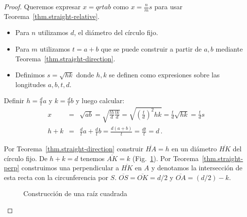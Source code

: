 \begin{proof}
Queremos expresar $x=qrt{ab}$ como $x=\displaystyle\frac{n}{m}s$ para usar Teorema~\ref{thm.straight-relative}.
\begin{itemize}
\setlength{\itemsep}{0pt}
\item Para $n$ utilizamos $d$, el diámetro del círculo fijo.
\item Para $m$ utilizamos $t=a+b$ que se puede construir a partir de $a,b$ mediante Teorema~\ref{thm.straight-direction}.
\item Definimos $s=\sqrt{hk}$ donde $h,k$ se definen como expresiones sobre las longitudes $a,b,t,d$.
\end{itemize}
Definir $h=\displaystyle\frac{d}{t}a$ y $k=\displaystyle\frac{d}{t}b$ y luego calcular:
\begin{eqnarray*}
x&=&\sqrt{ab}=\sqrt{\frac{th}{d}\frac{tk}{d}}=\sqrt{\left(\frac{t}{d}\right)^2hk}=\frac{t}{d}\sqrt{hk}=\frac{t}{d}s\\
h+k &=& \frac{d}{t}a + \frac{d}{t}b = \frac{d(a+b)}{t} = \frac{dt}{t} = d\,.
\end{eqnarray*}

Por Teorema~\ref{thm.straight-direction} construir $\overline{HA}= h$ en un diámetro $\overline{HK}$ del círculo fijo. De $h+k=d$ tenemos $\overline{AK}=k$ (Fig.~\ref{f.se-sqrt}). Por Teorema~\ref{thm.straight-perp} construimos una perpendicular a $\overline{HK}$ en $A$ y denotamos la intersección de esta recta con la circunferencia por $S$. $\overline{OS}=\overline{OK}=d/2$ y $\overline{OA}=(d/2)-k$. 
\begin{figure}[t]
\begin{center}
\end{center}
\caption{Construcción de una raíz cuadrada}\label{f.se-sqrt}
\end{figure}


\end{proof}
